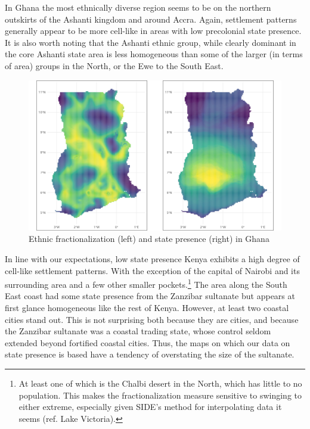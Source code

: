 In Ghana the most ethnically diverse region seems to be on the northern
outskirts of the Ashanti kingdom and around Accra. Again, settlement patterns
generally appear to be more cell-like in areas with low precolonial state
presence. It is also worth noting that the Ashanti ethnic group, while clearly
dominant in the core Ashanti state area is less homogeneous than some of the
larger (in terms of area) groups in the North, or the Ewe to the South East.

\begin{figure}[htpb]
	\centering
	\includegraphics[width=1\linewidth]{img/ghaplots.png}
	\caption{Ethnic fractionalization (left) and state presence (right) in
	Ghana}%
	\label{ghaplots}
\end{figure}

In line with our expectations, low state presence Kenya exhibits a high degree
of cell-like settlement patterns. With the exception of the capital of Nairobi
and its surrounding area and a few other smaller pockets.\footnote{At least one
	of which is the Chalbi desert in the North, which has little to no
population. This makes the fractionalization measure sensitive to swinging to
either extreme, especially given SIDE's method for interpolating data it seems
(ref. Lake Victoria).} The area along the South East coast had some state
presence from the Zanzibar sultanate but appears at first glance homogeneous
like the rest of Kenya. However, at least two coastal cities stand out. This is
not surprising both because they are cities, and because the Zanzibar sultanate
was a coastal trading state, whose control seldom extended beyond fortified
coastal cities. Thus, the maps on which our data on state presence is based have
a tendency of overstating the size of the sultanate.

